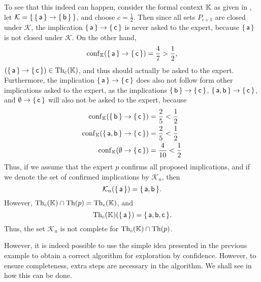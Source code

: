 \begin{Example}
  To see that this indeed can happen, consider the formal context ${\mathbb{K}}$ as given in
  , let $\mathcal{K} = {\{\,
    {\{\,\mathsf{a}\,\}} \to {\ensuremath{\{\,\mathsf{b}\,\}}} \,\}}$, and choose $c = \frac 1 2$.  Then since all
  sets $P_{i+1}$ are closed under $\mathcal{K}$, the implication ${\{\, \mathsf{a} \,\}} \to
  {\ensuremath{\{\, \mathsf{c} \,\}}}$ is never asked to the expert, because ${\{\, \mathsf{a} \,\}}$ is not
  closed under $\mathcal{K}$.  On the other hand,
  \begin{equation*}
    \operatorname{conf}_{{\mathbb{K}}} ( {\{\, \mathsf{a} \,\}} \to {\ensuremath{\{\, \mathsf{c} \,\}}}) = \frac 4 7 > \frac 1 2,
  \end{equation*}
  \ie $({\{\, \mathsf{a} \,\}} \to {\ensuremath{\{\, \mathsf{c} \,\}}}) \in \operatorname{Th}_{c}({\mathbb{K}})$, and thus should
  actually be asked to the expert.  Furthermore, the implication ${\{\, \mathsf{a} \,\}} \to
  {\ensuremath{\{\, \mathsf{c} \,\}}}$ does also not follow form other implications asked to the expert, as
  the implications ${\{\, \mathsf{b} \,\}} \to {\ensuremath{\{\, \mathsf{c} \,\}}}$, ${\{\, \mathsf{a},
    \mathsf{b} \,\}} \to {\ensuremath{\{\, \mathsf{c} \,\}}}$, and $\emptyset \to {\ensuremath{\{\, \mathsf{c} \,\}}}$ will also
  not be asked to the expert, because
  \begin{align*}
    \operatorname{conf}_{{\mathbb{K}}} ({\{\, \mathsf{b} \,\}} \to {\ensuremath{\{\, \mathsf{c} \,\}}}) &= \frac 2 5 < \frac 1 2\\
    \operatorname{conf}_{{\mathbb{K}}} ({\{\, \mathsf{a}, \mathsf{b} \,\}} \to {\ensuremath{\{\, \mathsf{c} \,\}}}) &= \frac 2 5 <
    \frac 1 2\\
    \operatorname{conf}_{{\mathbb{K}}}( \emptyset \to {\ensuremath{\{\, \mathsf{c} \,\}}} ) &= \frac 4 {10} < \frac 1 2
  \end{align*}
  Thus, if we assume that the expert $p$ confirms all proposed implications, and if we
  denote the set of confirmed implications by $\mathcal{K}_{n}$, then
  \begin{equation*}
    \mathcal{K}_{n}({\{\, \mathsf{a} \,\}}) = {\{\, \mathsf{a}, \mathsf{b} \,\}}.
  \end{equation*}
  However, $\operatorname{Th}_{c}({\mathbb{K}}) \cap \operatorname{Th}(p) = \operatorname{Th}_{c}({\mathbb{K}})$, and
  \begin{equation*}
    \operatorname{Th}_{c}({\mathbb{K}})({\{\, \mathsf{a} \,\}}) = {\{\, \mathsf{a}, \mathsf{b}, \mathsf{c} \,\}}.
  \end{equation*}
  Thus, the set $\mathcal{K}_{n}$ is not complete for $\operatorname{Th}_{c}({\mathbb{K}}) \cap \operatorname{Th}(p)$.
\end{Example}

However, it is indeed possible to use the simple idea presented in the previous example to
obtain a correct algorithm for exploration by confidence.  However, to ensure
completeness, extra steps are necessary in the algorithm.  We shall see in
 how this can be done.


